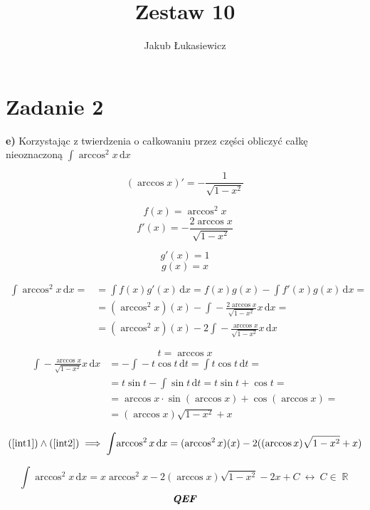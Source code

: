 \documentclass[12pt]{article}
\title{Zestaw 10}
\author{Jakub Łukasiewicz}
\date{}
\newcommand{\ex}[1]{\textbf{ #1)}}
\newcommand{\for}{\ \leftrightarrow\ }
\newcommand{\Integral}[2]{\int \! #1 \, \mathrm{d}#2}
\newcommand{\qef}{\textbf{\textit{QEF}}}
\newcommand{\task}[1]{\section*{Zadanie #1}}
\let\oldref\ref
\renewcommand{\ref}[1]{(\oldref{#1})}
\DeclareMathOperator{\R}{\mathbb{R}}
\begin{document}
\maketitle

\task{2}\ex{e}
Korzystając z twierdzenia o całkowaniu przez części obliczyć całkę nieoznaczoną
$ \displaystyle \Integral{\arccos^2{x}}{x} $

$$ (\arccos{x})' = -\frac{1}{\sqrt{1-x^2}} $$

\begin{multicols}{2}
    $$ f(x) = \arccos^2{x} $$
    $$ f'(x) = -\frac{2\arccos{x} }{\sqrt{1-x^2}} $$

    \columnbreak

    $$ g'(x) = 1 $$
    $$ g(x) = x $$
\end{multicols}

\begin{equation} \label{int1}
    \begin{aligned}
        \Integral{\arccos^2{x}}{x} =
        & = \Integral{f(x)g'(x)}{x} = f(x)g(x) - \Integral{f'(x)g(x)}{x} =\\
        & = (\arccos^2{x})(x) - \Integral{-\frac{2\arccos{x} }{\sqrt{1-x^2}}x}{x} =\\
        & = (\arccos^2{x})(x) - 2\Integral{-\frac{\arccos{x}}{\sqrt{1-x^2}}x}{x}
    \end{aligned}
\end{equation}

$$ t = \arccos{x} $$
\begin{equation} \label{int2}
    \begin{aligned}
        \Integral{-\frac{\arccos{x}}{\sqrt{1-x^2}}x}{x} &= -\Integral{-t \cos{t}}{t} =
        \Integral{t \cos{t}}{t} = \\
        & = t \sin{t} - \Integral{\sin{t}}{t} = t\sin{t} + \cos{t} = \\
        & = \arccos{x} \cdot \sin{(\arccos{x})} + \cos{(\arccos{x})} = \\
        & = (\arccos{x})\sqrt{1-x^2} + x
    \end{aligned}
\end{equation}

\begin{equation*}
    \ref{int1} \land \ref{int2} \implies
    \Integral{\arccos^2{x}}{x} =
    (\arccos^2{x})(x) - 2((\arccos{x})\sqrt{1-x^2} + x)
\end{equation*}

$$ \displaystyle \Integral{\arccos^2{x}}{x} = x \arccos^2{x} - 2(\arccos{x})\sqrt{1-x^2} - 2x + C \for C\in\R $$
$$\qef$$
\end{document}
